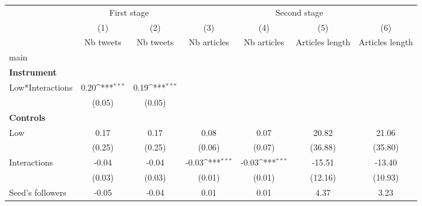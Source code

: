 {
\def\sym#1{\ifmmode^{#1}\else\(^{#1}\)\fi}
\begin{tabular}{l*{6}{c}}
\hline\hline
                    &\multicolumn{2}{c}{First stage}            &\multicolumn{4}{c}{Second stage}                                                       \\\cmidrule(lr){2-3}\cmidrule(lr){4-7}
                    &\multicolumn{1}{c}{(1)}&\multicolumn{1}{c}{(2)}&\multicolumn{1}{c}{(3)}&\multicolumn{1}{c}{(4)}&\multicolumn{1}{c}{(5)}&\multicolumn{1}{c}{(6)}\\
                    &\multicolumn{1}{c}{Nb tweets}&\multicolumn{1}{c}{Nb tweets}&\multicolumn{1}{c}{Nb articles}&\multicolumn{1}{c}{Nb articles}&\multicolumn{1}{c}{Articles length}&\multicolumn{1}{c}{Articles length}\\
\hline
main                &                     &                     &                     &                     &                     &                     \\
\textbf{Instrument} &                     &                     &                     &                     &                     &                     \\
Low*Interactions    &        0.20\sym{***}&        0.19\sym{***}&                     &                     &                     &                     \\
                    &      (0.05)         &      (0.05)         &                     &                     &                     &                     \\
\textbf{Controls}   &                     &                     &                     &                     &                     &                     \\
Low                 &        0.17         &        0.17         &        0.08         &        0.07         &       20.82         &       21.06         \\
                    &      (0.25)         &      (0.25)         &      (0.06)         &      (0.07)         &     (36.88)         &     (35.80)         \\
Interactions        &       -0.04         &       -0.04         &       -0.03\sym{***}&       -0.03\sym{***}&      -15.51         &      -13.40         \\
                    &      (0.03)         &      (0.03)         &      (0.01)         &      (0.01)         &     (12.16)         &     (10.93)         \\
Seed’s followers    &       -0.05         &       -0.04         &        0.01         &        0.01         &        4.37         &        3.23         \\

\end{tabular}}

